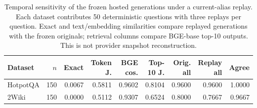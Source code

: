 \begin{table}[htbp]
\centering
\caption{Temporal sensitivity of the frozen hosted generations under a current-alias replay. Each dataset contributes 50 deterministic questions with three replays per question. Exact and text/embedding similarities compare replayed generations with the frozen originals; retrieval columns compare BGE-base top-10 outputs. This is not provider snapshot reconstruction.}
\label{tab:hosted_drift}
\scriptsize
\setlength{\tabcolsep}{3pt}
\begin{tabular}{lrrrrrrrr}
\toprule
Dataset & $n$ & Exact & Token J. & BGE cos. & Top-10 J. & Orig. all & Replay all & Agree \\
\midrule
HotpotQA & 150 & 0.0067 & 0.5811 & 0.9602 & 0.8104 & 0.9600 & 0.9600 & 1.0000 \\
2Wiki & 150 & 0.0000 & 0.5112 & 0.9307 & 0.6524 & 0.8000 & 0.7667 & 0.9667 \\
\bottomrule
\end{tabular}
\end{table}
